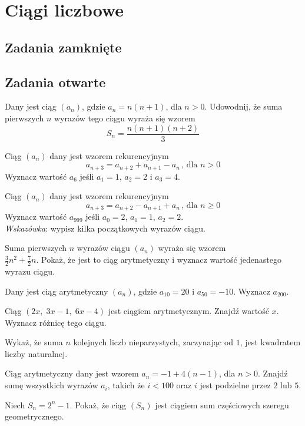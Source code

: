 \setcounter{parc}{0}
\addtocounter{chapc}{1}

\chapter{Ciągi liczbowe}

\section{Zadania zamknięte}

\section{Zadania otwarte}

\zadanie Dany jest ciąg $(a_n)$, gdzie $a_n = n(n+1)$, dla $n > 0$. Udowodnij, że suma pierwszych $n$ wyrazów tego ciągu wyraża się wzorem \[S_n = \dfrac{n(n+1)(n+2)}{3}\]

\zadanie Ciąg $(a_n)$ dany jest wzorem rekurencyjnym \[a_{n+3} = a_{n+2} + a_{n+1} - a_{n}\,\text{,  dla } n > 0\] Wyznacz wartość $a_6$ jeśli $a_1 = 1$, $a_2 = 2$ i $a_3 = 4$.

\zadanie Ciąg $(a_n)$ dany jest wzorem rekurencyjnym \[a_{n+3} = a_{n+2} - a_{n+1} + a_{n}\,\text{,  dla } n \geqslant 0\] Wyznacz wartość $a_{999}$ jeśli $a_0 = 2$, $a_1 = 1$, $a_2 = 2$. \\{\footnotesize\textit{Wskazówka}: wypisz kilka początkowych wyrazów ciągu.}

\zadanie Suma pierwszych $n$ wyrazów ciągu $(a_n)$ wyraża się wzorem \\${\frac{3}{2}n^2 + \frac{7}{2}n}$. Pokaż, że jest to ciąg arytmetyczny i wyznacz wartość jedenastego wyrazu ciągu.

\zadanie Dany jest ciąg arytmetyczny $(a_n)$, gdzie $a_{10} = 20$ i $a_{50} = -10$. Wyznacz $a_{200}$.

\zadanie Ciąg $(2x,\;3x - 1,\;6x - 4)$ jest ciągiem arytmetycznym. Znajdź wartość $x$. Wyznacz różnicę tego ciągu.

\zadanie Wykaż, że suma $n$ kolejnych liczb nieparzystych, zaczynając od $1$, jest kwadratem liczby naturalnej.

\zadanie Ciąg arytmetyczny dany jest wzorem $a_n = -1 + 4(n - 1)$, dla $n > 0$. Znajdź sumę wszystkich wyrazów $a_i$, takich że $i < 100$ oraz $i$ jest podzielne przez $2$ lub $5$.

\zadanie Niech $S_n = 2^n - 1$. Pokaż, że ciąg $(S_n)$ jest ciągiem sum częściowych szeregu geometrycznego.

